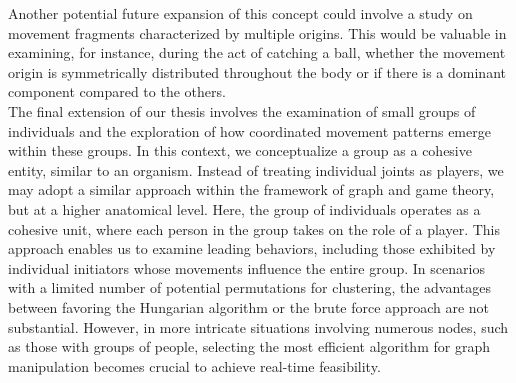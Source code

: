 Another potential future expansion of this concept could involve a study on movement fragments characterized by multiple origins.
This would be valuable in examining, for instance, during the act of catching a ball, whether the movement origin is symmetrically distributed throughout the body or if there is a dominant component compared to the others.\\

The final extension of our thesis involves the examination of small groups of individuals and the exploration of how coordinated movement patterns emerge within these groups.
In this context, we conceptualize a group as a cohesive entity, similar to an organism.
Instead of treating individual joints as players, we may adopt a similar approach within the framework of graph and game theory, but at a higher anatomical level.
Here, the group of individuals operates as a cohesive unit, where each person in the group takes on the role of a player. 
This approach enables us to examine leading behaviors, including those exhibited by individual initiators whose movements influence the entire group.
In scenarios with a limited number of potential permutations for clustering, the advantages between favoring the Hungarian algorithm or the brute force approach are not substantial. 
However, in more intricate situations involving numerous nodes, such as those with groups of people, selecting the most efficient algorithm for graph manipulation becomes crucial to achieve real-time feasibility.
